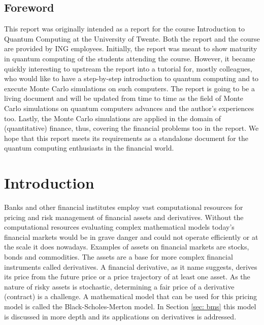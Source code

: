 \documentclass[../main.tex]{subfiles}
\begin{document}
\subsection*{Foreword}
This report was originally intended as a report for the course Introduction to Quantum Computing at the University of Twente. Both the report and the course are provided by ING employees. Initially, the report was meant to show maturity in quantum computing of the students attending the course. However, it became quickly interesting to upstream the report into a tutorial for, mostly colleagues, who would like to have a step-by-step introduction to quantum computing and to execute Monte Carlo simulations on such computers. The report is going to be a living document and will be updated from time to time as the field of Monte Carlo simulations on quantum computers advances and the author's experiences too. Lastly, the Monte Carlo simulations are applied in the domain of (quantitative) finance, thus, covering the financial problems too in the report. We hope that this report meets its requirements as a standalone document for the quantum computing enthusiasts in the financial world.

\section{Introduction}\label{sec: introduction}

Banks and other financial institutes employ vast computational resources for pricing and risk management of financial assets and derivatives. Without the computational resources evaluating complex mathematical models today's financial markets would be in grave danger and could not operate efficiently or at the scale it does nowadays. Examples of assets on financial markets are stocks, bonds and commodities. The assets are a base for more complex financial instruments called derivatives. A financial derivative, as it name suggests, derives its price from the future price or a price trajectory of at least one asset. As the nature of risky assets is stochastic, determining a fair price of a derivative (contract) is a challenge. A mathematical model that can be used for this pricing model is called the Black-Scholes-Merton model. In Section \ref{sec: bms} this model is discussed in more depth and its applications on derivatives is addressed.
\par
\end{document}
